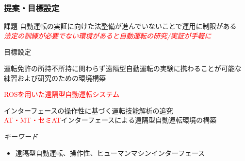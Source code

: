 \documentclass[unicode, 9pt, aspectratio=169]{beamer}
\begin{document}
\begin{frame}
  \frametitle{提案・目標設定}
  \centering
  \begin{minipage}{.8\linewidth}
    \begin{block}{課題}
      自動運転の実証に向けた法整備が進んでいないことで運用に制限がある\\
      \centering
      \Large \emph{\textcolor{red}{法定の訓練が必要でない環境があると自動運転の研究/実証が手軽に}}
    \end{block}

    \begin{alertblock}{目標設定}
      \begin{description}[目的]
        \item[目的] 運転免許の所持不所持に関わらず遠隔型自動運転の実験に携わることが可能な\\練習および研究のための環境構築
        \item[提案] \textcolor{red}{ROSを用いた遠隔型自動運転システム}
        \item[方法] インターフェースの操作性に基づく運転技能解析の追究
        \\ \textcolor{red}{AT・MT・セミAT}インターフェースによる遠隔型自動運転環境の構築
      \end{description}
    \end{alertblock}
  \end{minipage}

  \begin{minipage}{.6\linewidth}
      \begin{exampleblock}{}
          \centering
          \Large \emph{キーワード}
      \end{exampleblock}
      \begin{itemize}
        \item[＊]遠隔型自動運転、操作性、ヒューマンマシンインターフェース  
      \end{itemize}
  \end{minipage}
\end{frame}
\end{document}
